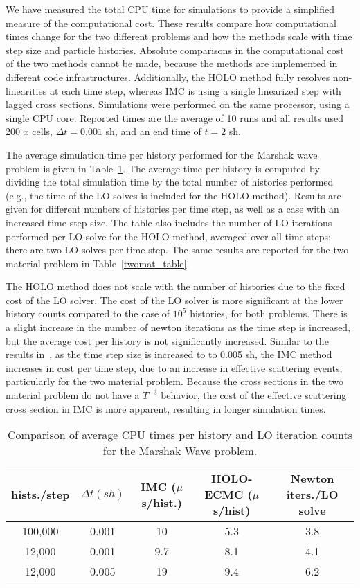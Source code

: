 We have measured the total CPU time for simulations to provide a simplified measure of the
computational cost.  These results compare how computational times change for the two
different problems and how the methods scale with time step size and particle histories.  Absolute comparisons in the computational cost of the two
methods cannot be made, because the methods are implemented
in different code infrastructures. Additionally, the HOLO method fully resolves
non-linearities at each time step, whereas IMC is using a single linearized step with
lagged cross sections. Simulations were performed on the same processor, using a single CPU
core.  Reported times are the average of 10 runs and all results used 200 $x$ cells,
$\Delta t = 0.001$ sh, and an end time of $t=2$ sh.

The average simulation time per history performed for the Marshak wave problem
is given in Table~\ref{marshak_table}.  The average time per history is
computed by dividing the total simulation time by the total number of histories
performed (e.g., the time of the LO solves is included for the HOLO method).
Results are given for different numbers of histories per time step, as well as
a case with an increased time step size.  The table also includes the number of
LO iterations performed per LO solve for the HOLO method, averaged over all
time steps; there are two LO solves per time step.  The same results are
reported for the two material problem in Table~\ref{twomat_table}.

The HOLO method does not scale with the number of
histories due to the fixed cost of the LO solver.  The cost of the LO solver is more
significant at the lower history counts compared to the case of $10^5$
histories, for both problems. 
There is a slight increase in the number of
newton iterations as the time step is increased, but the average cost per history is
not significantly increased.   Similar to the results
in~\cite{park}, as the time step size is increased to to 0.005 sh, the IMC method
increases in cost per time step, due to an increase in effective scattering events, particularly for the two material problem. Because
the cross sections in the two material problem do not have a $T^{-3}$
behavior, the cost of the effective scattering cross section in IMC is more apparent,
resulting in longer simulation times. 
\begin{table}[H]
\centering
\caption{\label{marshak_table} {Comparison of average CPU times per history
    and LO iteration counts for the Marshak Wave problem. }}
\vspace{-0.1in}
	\begin{tabular}{|cc|c|cc|}\hline
hists./step & $\Delta t (sh)$ & IMC ($\mu$s/hist.) & HOLO-ECMC ($\mu$s/hist) & Newton
iters./LO solve \\ \hline
100,000                    &   0.001	& 10  &  5.3   & 3.8               \\
12,000           &   0.001	& 9.7 &	 8.1   & 4.1               \\
12,000          &   0.005	& 19  &  9.4   & 6.2                \\ \hline
\end{tabular}
\end{table}

